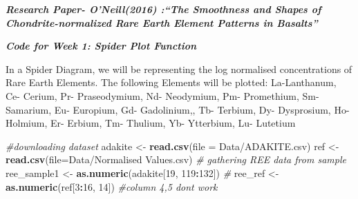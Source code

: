 \documentclass[
]{article}
\newenvironment{Shaded}{\begin{snugshade}}{\end{snugshade}}
\newcommand{\AttributeTok}[1]{\textcolor[rgb]{0.13,0.29,0.53}{#1}}
\newcommand{\CommentTok}[1]{\textcolor[rgb]{0.56,0.35,0.01}{\textit{#1}}}
\newcommand{\DecValTok}[1]{\textcolor[rgb]{0.00,0.00,0.81}{#1}}
\newcommand{\FunctionTok}[1]{\textcolor[rgb]{0.13,0.29,0.53}{\textbf{#1}}}
\newcommand{\NormalTok}[1]{#1}
\newcommand{\OtherTok}[1]{\textcolor[rgb]{0.56,0.35,0.01}{#1}}
\newcommand{\SpecialCharTok}[1]{\textcolor[rgb]{0.81,0.36,0.00}{\textbf{#1}}}
\newcommand{\StringTok}[1]{\textcolor[rgb]{0.31,0.60,0.02}{#1}}
\begin{document}
\textbf{\emph{Research Paper- O'Neill(2016) :``The Smoothness and Shapes
of Chondrite-normalized Rare Earth Element Patterns in Basalts''}}

\textbf{\emph{Code for Week 1: Spider Plot Function}}

In a Spider Diagram, we will be representing the log normalised
concentrations of Rare Earth Elements. The following Elements will be
plotted: La-Lanthanum, Ce- Cerium, Pr- Praseodymium, Nd- Neodymium, Pm-
Promethium, Sm- Samarium, Eu- Europium, Gd- Gadolinium,, Tb- Terbium,
Dy- Dysprosium, Ho- Holmium, Er- Erbium, Tm- Thulium, Yb- Ytterbium, Lu-
Lutetium

\begin{Shaded}
\begin{Highlighting}[]
\CommentTok{\#downloading dataset}
\NormalTok{adakite }\OtherTok{\textless{}{-}} \FunctionTok{read.csv}\NormalTok{(}\AttributeTok{file =} \StringTok{\textquotesingle{}Data/ADAKITE.csv\textquotesingle{}}\NormalTok{)}
\NormalTok{ref }\OtherTok{\textless{}{-}} \FunctionTok{read.csv}\NormalTok{(}\AttributeTok{file=}\StringTok{\textquotesingle{}Data/Normalised Values.csv\textquotesingle{}}\NormalTok{)}
\CommentTok{\# gathering REE data from sample}
\NormalTok{ree\_sample1 }\OtherTok{\textless{}{-}} \FunctionTok{as.numeric}\NormalTok{(adakite[}\DecValTok{19}\NormalTok{, }\DecValTok{119}\SpecialCharTok{:}\DecValTok{132}\NormalTok{])}
\CommentTok{\#}
\NormalTok{ree\_ref }\OtherTok{\textless{}{-}} \FunctionTok{as.numeric}\NormalTok{(ref[}\DecValTok{3}\SpecialCharTok{:}\DecValTok{16}\NormalTok{, }\DecValTok{14}\NormalTok{]) }\CommentTok{\#column 4,5 dont work}


\end{Highlighting}
\end{Shaded}
\end{document}
